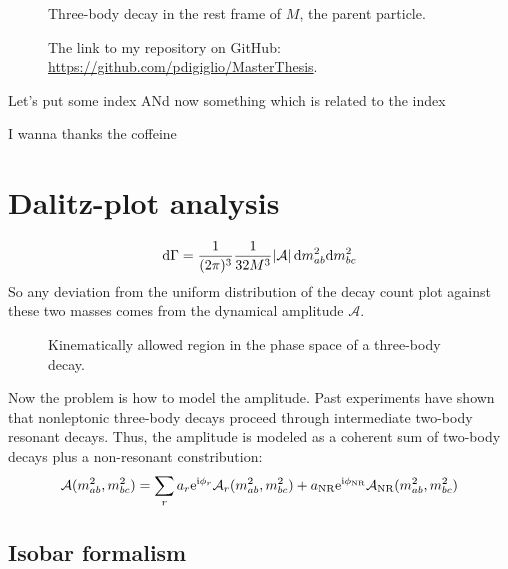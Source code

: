 \documentclass[
	10pt,
	twoside,
	openright,
]{scrbook}
\newcommand{\A}{\ensuremath{\mathcal{A}}}
\begin{document}
\begin{figure}
    \centering

    \caption{Three-body decay in the rest frame of $M$, the parent particle.}
\end{figure}



\begin{figure}
	\centering
\caption{The link to my repository on GitHub: \url{https://github.com/pdigiglio/MasterThesis}.}
\end{figure}


Let's put some index
ANd now something which is related to the index






I wanna thanks the coffeine
%

\chapter{Dalitz-plot analysis}

\begin{equation}
    \ud\Gamma = \frac{1}{(2\pi)^3}\frac{1}{32M^3}\abs{\A}\ud m_{ab}^2 \!\ud m_{bc}^2
\end{equation}
So any deviation from the uniform distribution of the decay count plot against these two masses comes from the dynamical amplitude \A{}.

\begin{figure}
    \centering
%
    \caption{Kinematically allowed region in the phase space of a three-body decay.}
\end{figure}


Now the problem is how to model the amplitude.
Past experiments have shown that nonleptonic three-body decays proceed through intermediate two-body resonant decays.
Thus, the amplitude is modeled as a coherent sum of two-body decays plus a non-resonant constribution:
\begin{equation}
    \A(m_{ab}^2, m_{bc}^2) = \sum_r a_r \eu^{\iu\phi_r}\A_r(m_{ab}^2,m_{bc}^2)
    + a_{\textup{NR}} \eu^{\iu \phi_{\textup{NR}}} \A_{\textup{NR}}(m_{ab}^2,m_{bc}^2)
\end{equation}

\section{Isobar formalism}
\end{document}

